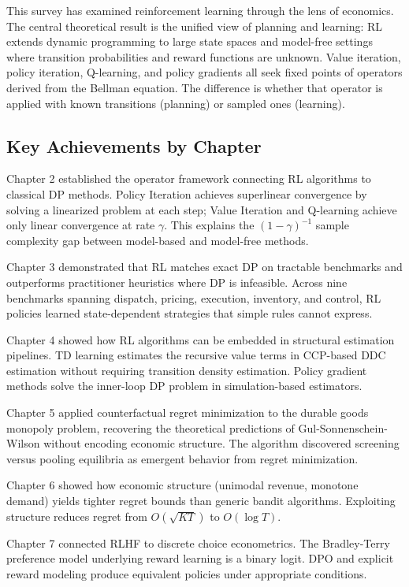 This survey has examined reinforcement learning through the lens of economics. The central theoretical result is the unified view of planning and learning: RL extends dynamic programming to large state spaces and model-free settings where transition probabilities and reward functions are unknown. Value iteration, policy iteration, Q-learning, and policy gradients all seek fixed points of operators derived from the Bellman equation. The difference is whether that operator is applied with known transitions (planning) or sampled ones (learning).

\subsection*{Key Achievements by Chapter}

Chapter 2 established the operator framework connecting RL algorithms to classical DP methods. Policy Iteration achieves superlinear convergence by solving a linearized problem at each step; Value Iteration and Q-learning achieve only linear convergence at rate $\gamma$. This explains the $(1-\gamma)^{-1}$ sample complexity gap between model-based and model-free methods.

Chapter 3 demonstrated that RL matches exact DP on tractable benchmarks and outperforms practitioner heuristics where DP is infeasible. Across nine benchmarks spanning dispatch, pricing, execution, inventory, and control, RL policies learned state-dependent strategies that simple rules cannot express.

Chapter 4 showed how RL algorithms can be embedded in structural estimation pipelines. TD learning estimates the recursive value terms in CCP-based DDC estimation without requiring transition density estimation. Policy gradient methods solve the inner-loop DP problem in simulation-based estimators.

Chapter 5 applied counterfactual regret minimization to the durable goods monopoly problem, recovering the theoretical predictions of Gul-Sonnenschein-Wilson without encoding economic structure. The algorithm discovered screening versus pooling equilibria as emergent behavior from regret minimization.

Chapter 6 showed how economic structure (unimodal revenue, monotone demand) yields tighter regret bounds than generic bandit algorithms. Exploiting structure reduces regret from $O(\sqrt{KT})$ to $O(\log T)$.

Chapter 7 connected RLHF to discrete choice econometrics. The Bradley-Terry preference model underlying reward learning is a binary logit. DPO and explicit reward modeling produce equivalent policies under appropriate conditions.

